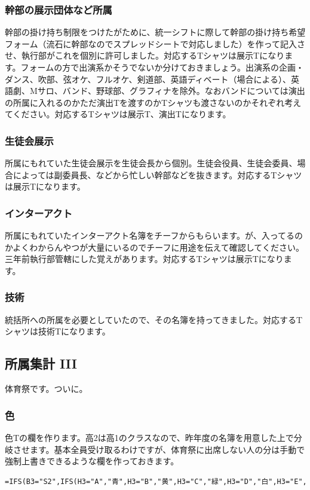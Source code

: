 \documentclass[a4paper]{ltjsreport}
\begin{document}
\subsubsection{幹部の展示団体など所属}
幹部の掛け持ち制限をつけたがために、統一シフトに際して幹部の掛け持ち希望フォーム（流石に幹部なのでスプレッドシートで対応しました）を作って記入させ、執行部がこれを個別に許可しました。対応するTシャツは展示Tになります。フォームの方で出演系かそうでないか分けておきましょう。出演系の企画・ダンス、吹部、弦オケ、フルオケ、剣道部、英語ディベート（場合による）、英語劇、Mサロ、バンド、野球部、グラフィナを除外。なおバンドについては演出の所属に入れるのかただ演出Tを渡すのかTシャツも渡さないのかそれぞれ考えてください。対応するTシャツは展示T、演出Tになります。

\subsubsection{生徒会展示}
所属にもれていた生徒会展示を生徒会長から個別。生徒会役員、生徒会委員、場合によっては副委員長、などから忙しい幹部などを抜きます。対応するTシャツは展示Tになります。

\subsubsection{インターアクト}
所属にもれていたインターアクト名簿をチーフからもらいます。が、入ってるのかよくわからんやつが大量にいるのでチーフに用途を伝えて確認してください。三年前執行部管轄にした覚えがあります。対応するTシャツは展示Tになります。

\subsubsection{技術}
統括所への所属を必要としていたので、その名簿を持ってきました。対応するTシャツは技術Tになります。

\subsection{所属集計 III}
体育祭です。ついに。

\subsubsection{色}
色Tの欄を作ります。高2は高1のクラスなので、昨年度の名簿を用意した上で分岐させます。基本全員受け取るわけですが、体育祭に出席しない人の分は手動で強制上書きできるような欄を作っておきます。
\\
\begin{lstlisting}
=IFS(B3="S2",IFS(H3="A","青",H3="B","黄",H3="C","緑",H3="D","白",H3="E","赤"),B3<>"S2",I3)
\end{lstlisting}
\end{document}
